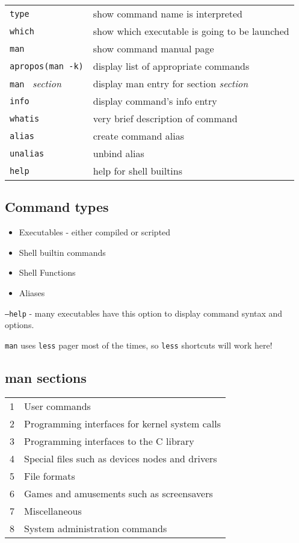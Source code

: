 \documentclass[8pt]{extarticle}
\begin{document}
\begin{multicols}{2}
\begin{tabular}{ll}
	\texttt{type} & show command name is interpreted\\
	\texttt{which} & show which executable is going to be launched\\
	\texttt{man} & show command manual page\\
	\texttt{apropos(man -k)} & display list of appropriate commands\\
	\texttt{man } \textit{section} & display man entry for section \textit{section}\\
	\texttt{info} & display command's info entry\\
	\texttt{whatis} & very brief description of command\\
	\texttt{alias} & create command alias\\
	\texttt{unalias} & unbind alias\\
	\texttt{help} & help for shell builtins
\end{tabular}

\subsection{Command types}
\begin{itemize}
	\item Executables - either compiled or scripted
	\item Shell builtin commands
	\item Shell Functions
	\item Aliases
\end{itemize}

\texttt{--help} - many executables have this option to display command syntax and options.

\texttt{man} uses \texttt{less} pager most of the times, so \texttt{less} shortcuts will work here!

\subsection{man sections}
\begin{tabular}{ll}
1 &  User commands\\
2 & Programming interfaces for kernel system calls\\
3 & Programming interfaces to the C library\\
4 & Special files such as devices nodes and drivers\\
5 & File formats\\
6 & Games and amusements such as screensavers\\
7 & Miscellaneous\\
8 & System administration commands
\end{tabular}


\end{multicols}
\end{document}
